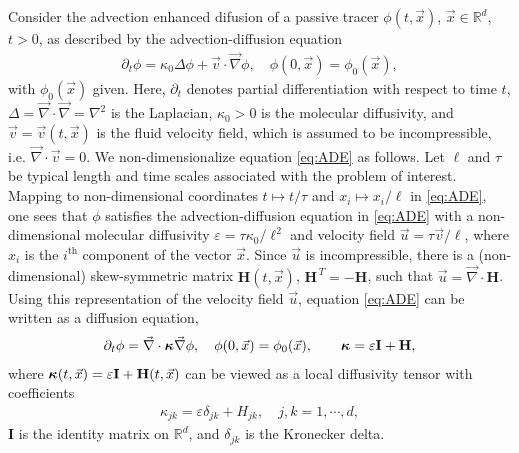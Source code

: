 \documentclass[11pt]{amsart}
\newcommand{\Hb}{\mathbf{H}}
\newcommand{\Ib}{\mathbf{I}}
\newcommand\bkappa{\mbox{\boldmath${\kappa}$}}
\begin{document}
Consider the advection enhanced difusion of a passive tracer
$\phi(t,\vec{x})$, $\vec{x}\in\mathbb{R}^d$, $t>0$, as described by the
advection-diffusion equation 
%
\begin{align}\label{eq:ADE}
  \partial_t\phi=\kappa_0\Delta \phi+\vec{v}\cdot\vec{\nabla}\phi, \quad
  \phi(0,\vec{x})=\phi_0(\vec{x}),
\end{align}
%
with $\phi_0(\vec{x})$ given. Here, $\partial_t$ denotes partial differentiation
with respect to time $t$, $\Delta=\vec{\nabla}\cdot\vec{\nabla}=\nabla^2$ is the Laplacian,
$\kappa_0>0$ is the molecular diffusivity, and $\vec{v}=\vec{v}(t,\vec{x})$
is the fluid velocity field, which is assumed to be incompressible,
i.e. $\vec{\nabla}\cdot\vec{v}=0$. We non-dimensionalize equation
\eqref{eq:ADE} as follows. Let $\ell$ and $\tau$ be typical length and time 
scales associated with the problem of interest. Mapping to
non-dimensional coordinates $t\mapsto t/\tau$ and $x_i\mapsto x_i/\ell$ in
\eqref{eq:ADE}, one sees that $\phi$ satisfies the advection-diffusion
equation in \eqref{eq:ADE} with a non-dimensional molecular
diffusivity $\varepsilon=\tau\kappa_0/\ell^2$ and velocity field $\vec{u}=\tau\vec{v}/\ell$,
where $x_i$ is the $i^{\text{th}}$ component of the vector
$\vec{x}$. Since $\vec{u}$ is incompressible, there is a
(non-dimensional) skew-symmetric matrix $\Hb(t,\vec{x})$,
$\Hb^{\,T}=-\Hb$, such that $\vec{u}=\vec{\nabla}\cdot\Hb$. 
Using this representation of the velocity field $\vec{u}$, equation
\eqref{eq:ADE} can be written as a diffusion equation, 
%
\begin{align}\label{eq:ADE_Divergence}
  \partial_t\phi%
    =\vec{\nabla}\cdot\bkappa\vec{\nabla}\phi, \quad
    \phi(0,\vec{x})=\phi_0(\vec{x}),
    \qquad
    \bkappa=\varepsilon\Ib+\Hb,
\end{align}
%
where $\bkappa(t,\vec{x})=\varepsilon\Ib+\Hb(t,\vec{x})$ can be viewed as a local
diffusivity tensor with coefficients
%
\begin{align}\label{eq:kappa_coeff}
  \kappa_{jk}=\varepsilon\delta_{jk}+H_{jk},\quad j,k=1,\cdots,d,
\end{align}
%
$\Ib$ is the identity matrix on $\mathbb{R}^d$, and $\delta_{jk}$ is 
the Kronecker delta. 
\end{document}
